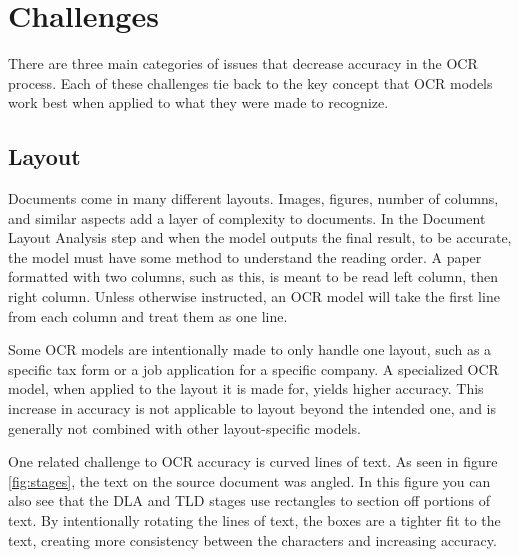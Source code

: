 \documentclass[sigplan,screen,nonacm]{acmart-tagged}
\begin{document}
\section{Challenges}
\label{sec:body}
There are three main categories of issues that decrease accuracy in the OCR process. Each of these challenges tie back to the key concept that OCR models work best when applied to what they were made to recognize.

\subsection{Layout}
\label{Layout}
Documents come in many different layouts. Images, figures, number of columns, and similar aspects add a layer of complexity to documents. In the Document Layout Analysis step and when the model outputs the final result, to be accurate, the model must have some method to understand the reading order. 
A paper formatted with two columns, such as this, is meant to be read left column, then right column. Unless otherwise instructed, an OCR model will take the first line from each column and treat them as one line. 

Some OCR models are intentionally made to only handle one layout, such as a specific tax form or a job application for a specific company. A specialized OCR model, when applied to the layout it is made for, yields higher accuracy. This increase in accuracy is not applicable to layout beyond the intended one, and is generally not combined with other layout-specific models.

One related challenge to OCR accuracy is curved lines of text. As seen in figure \ref{fig:stages}, the text on the source document was angled. In this figure you can also see that the DLA and TLD stages use rectangles to section off portions of text. By intentionally rotating the lines of text, the boxes are a tighter fit to the text, creating more consistency between the characters and increasing accuracy. \cite{Fateh:2024}
\end{document}

